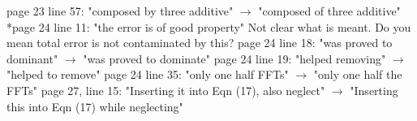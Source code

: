 \documentclass[a4paper]{article}
\begin{document}
page 23 line 57: "composed by three additive" $\rightarrow$ "composed of three additive"
*page 24 line 11: "the error is of good property" Not clear what is meant. Do you mean total error is not
                 contaminated by this?
page 24 line 18: "was proved to dominant" $\rightarrow$ "was proved to dominate"
page 24 line 19: "helped removing" $\rightarrow$ "helped to remove"
page 24 line 35: "only one half FFTs" $\rightarrow$ "only one half the FFTs"
page 27, line 15: "Inserting it into Eqn (17), also neglect" $\rightarrow$ "Inserting this into Eqn (17) while neglecting"
\end{document}
